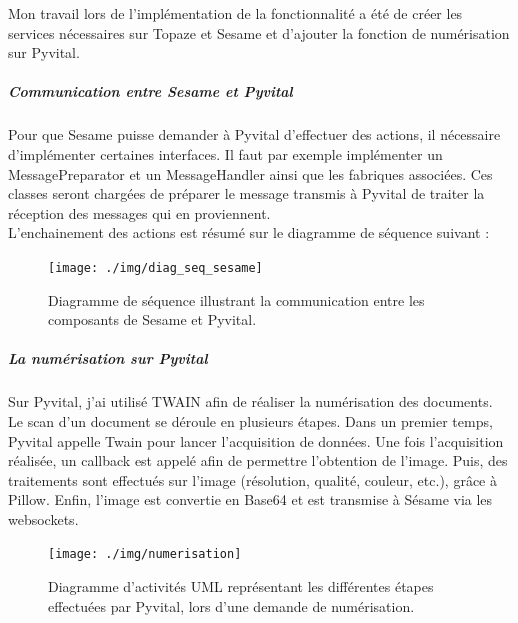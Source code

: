 Mon travail lors de l'implémentation de la fonctionnalité a été de créer les services nécessaires sur Topaze et Sesame et d'ajouter la fonction de numérisation sur Pyvital.

\subparagraph*{Communication entre Sesame et Pyvital}
Pour que Sesame puisse demander à Pyvital d'effectuer des actions, il nécessaire d'implémenter certaines interfaces. Il faut par exemple implémenter un MessagePreparator et un MessageHandler ainsi que les fabriques associées. Ces classes seront chargées de préparer le message transmis à Pyvital de traiter la réception des messages qui en proviennent. \\
L'enchainement des actions est résumé sur le diagramme de séquence suivant :

\begin{figure}[H]
  \centering
  \vspace{-5pt}
  \texttt{[image: ./img/diag\_seq\_sesame]}
  \caption{\label{fig:diag_seq_sesame} Diagramme de séquence illustrant la communication entre les composants de Sesame et Pyvital.}
\end{figure}

\subparagraph*{La numérisation sur Pyvital}
Sur Pyvital, j'ai utilisé TWAIN afin de réaliser la numérisation des documents. Le scan d'un document se déroule en plusieurs étapes. Dans un premier temps, Pyvital appelle Twain pour lancer l'acquisition de données. Une fois l'acquisition réalisée, un callback est appelé afin de permettre l'obtention de l'image. Puis, des traitements sont effectués sur l'image (résolution, qualité, couleur, etc.), grâce à Pillow. Enfin, l'image est convertie en Base64 et est transmise à Sésame via les websockets.
 
\begin{figure}[H]
  \centering
  \vspace{-10pt}
  \texttt{[image: ./img/numerisation]}
  \caption{\label{fig:diag_seq_sesame} Diagramme d'activités UML représentant les différentes étapes effectuées par Pyvital, lors d'une demande de numérisation.}
\end{figure}


		
